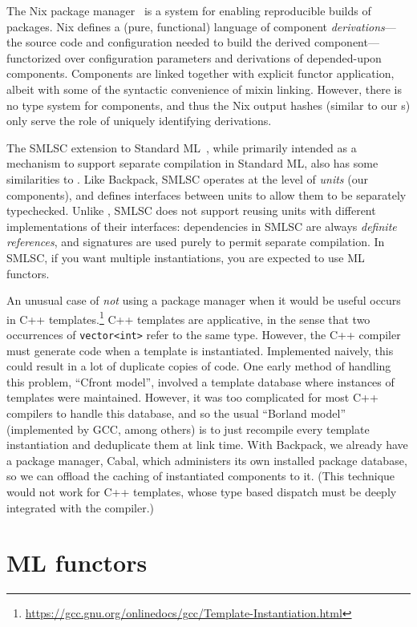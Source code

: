 The Nix package manager~\cite{dolstra:thesis} is a
system for enabling reproducible builds of packages. Nix defines a (pure, functional) language of component
\emph{derivations}---\ie{} the source code and configuration
needed to build the derived component---%
functorized over configuration parameters and derivations of
depended-upon components.  Components are linked together with explicit
functor application, albeit with some of the syntactic convenience of
mixin linking.  However, there is no type system for components,
and thus the Nix output hashes (similar to our \cid{}s) only serve
the role of uniquely identifying derivations.

The SMLSC extension to Standard ML~\cite{swasey+:smlsc}, while
primarily intended as a mechanism to support separate compilation in
Standard ML, also has some similarities to \Backpack{}.  Like
Backpack, SMLSC operates at the level of \emph{units} (our
components), and defines interfaces between units to allow them to be
separately typechecked.  Unlike \Backpack{}, SMLSC does not support
reusing units with different
implementations of their interfaces: dependencies in SMLSC are always
\emph{definite references}, and signatures are used purely to permit
separate compilation.  In SMLSC, if you want multiple instantiations,
you are expected to use ML functors.

An unusual case of \emph{not} using a package manager when it would be
useful occurs in C++ templates.\footnote{\smaller%
  \url{https://gcc.gnu.org/onlinedocs/gcc/Template-Instantiation.html}}
C++ templates are
applicative, in the sense that two occurrences of \verb|vector<int>| refer to the
same type.  However, the C++ compiler must generate code when a
template is instantiated. Implemented naively, this could result in a
lot of duplicate copies of code.  One early method of handling this
problem, ``Cfront model'', involved a template database where
instances of templates were maintained.  However, it was too
complicated for most C++ compilers to handle this database, and so the
usual ``Borland model'' (implemented by GCC, among others) is to just
recompile every template instantiation and deduplicate them at link
time.  With Backpack, we already have a package manager, Cabal, which
administers its own installed package database, so we can offload the
caching of instantiated components to it.  (This technique would not
work for C++ templates, whose type based dispatch must be deeply
integrated with the compiler.)

\section{ML functors}

